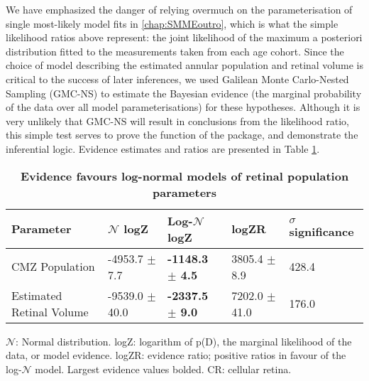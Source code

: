We have emphasized the danger of relying overmuch on the parameterisation of single most-likely model fits in \autoref{chap:SMMEoutro}, which is what the simple likelihood ratios above represent: the joint likelihood of the maximum a posteriori distribution fitted to the measurements taken from each age cohort. Since the choice of model describing the estimated annular population and retinal volume is critical to the success of later inferences, we used Galilean Monte Carlo-Nested Sampling (GMC-NS) to estimate the Bayesian evidence (the marginal probability of the data over all model parameterisations) for these hypotheses. Although it is very unlikely that GMC-NS will result in conclusions from the likelihood ratio, this simple test serves to prove the function of the  package, and demonstrate the inferential logic. Evidence estimates and ratios are presented in Table \ref{PZRtable}.

\begin{table}[!ht]
    \centering
    \caption{
    {\bf Evidence favours log-normal models of retinal population parameters}}
    \begin{tabular}{|l|l|l|l|l|}
    \hline
    {\bf Parameter} & {\bf $\mathcal{N}$ logZ} & {\bf Log-$\mathcal{N}$ logZ} & {\bf logZR} & {\bf $\sigma$ significance}\\ \hline
    CMZ Population & -4953.7 $\pm$ 7.7 & {\bf -1148.3 $\pm$ 4.5} & 3805.4 $\pm$ 8.9 & 428.4\\ \hline
    Estimated Retinal Volume & -9539.0 $\pm$ 40.0 & {\bf -2337.5 $\pm$ 9.0} & 7202.0 $\pm$ 41.0 & 176.0\\ \hline
    \end{tabular}
    \begin{flushleft} $\mathcal{N}$: Normal distribution. logZ: logarithm of p(D), the marginal likelihood of the data, or model evidence. logZR: evidence ratio; positive ratios in favour of the log-$\mathcal{N}$ model. Largest evidence values bolded. CR: cellular retina.
    \end{flushleft}
    \label{PZRtable}
\end{table}

